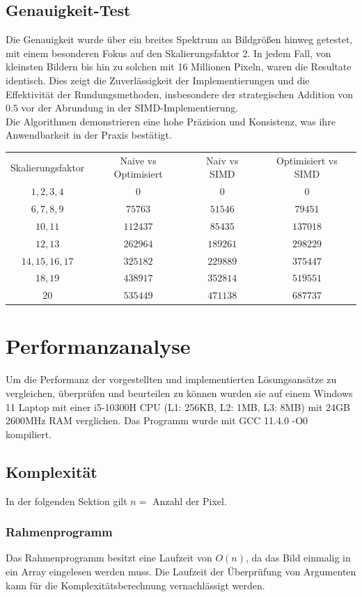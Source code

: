 \documentclass[course=erap]{aspdoc}
\begin{document}
\subsection{Genauigkeit-Test}
Die Genauigkeit wurde über ein breites Spektrum an Bildgrößen hinweg getestet, mit einem besonderen Fokus auf den Skalierungsfaktor 2. In jedem Fall, von kleinsten Bildern bis hin zu solchen mit 16 Millionen Pixeln, waren die Resultate identisch. Dies zeigt die Zuverlässigkeit der Implementierungen und die Effektivität der Rundungsmethoden, insbesondere der strategischen Addition von $0.5$ vor der Abrundung in der SIMD-Implementierung.\\
Die Algorithmen demonstrieren eine hohe Präzision und Konsistenz, was ihre Anwendbarkeit in der Praxis bestätigt.

\begin{tabular}[h]{cccc} %
 Skalierungsfaktor & Naive vs Optimisiert & Naiv vs SIMD & Optimisiert vs SIMD \\
 $1, 2, 3, 4$ & 0 & 0 & 0 \\
 $6, 7, 8, 9$ & $75763$ & $51546$ & $79451$ \\
 $10, 11$ & $112437$ & $85435$ & $137018$ \\
 $12, 13$ & $262964$ & $189261$ & $298229$ \\
 $14, 15, 16, 17$ & $325182$ & $229889$ & $375447$ \\
 $18, 19$ & $438917$ & $352814$ & $519551$ \\
 $20$ & $535449$ & $471138$ & $687737$
\end{tabular}


\section{Performanzanalyse}
Um die Performanz der vorgestellten und implementierten Lösungsansätze zu vergleichen, überprüfen und beurteilen zu können wurden sie auf einem Windows 11 Laptop mit einer i5-10300H CPU (L1: 256KB, L2: 1MB, L3: 8MB) mit 24GB 2600MHz RAM verglichen. Das Programm wurde mit GCC 11.4.0 -O0 kompiliert.

\subsection{Komplexität}
In der folgenden Sektion gilt $n =$ Anzahl der Pixel.

\subsubsection{Rahmenprogramm}
Das Rahmenprogramm besitzt eine Laufzeit von $O(n)$, da das Bild einmalig in ein Array eingelesen werden muss. Die Laufzeit der Überprüfung von Argumenten kann für die Komplexitätsberechnung vernachlässigt werden.
\end{document}

